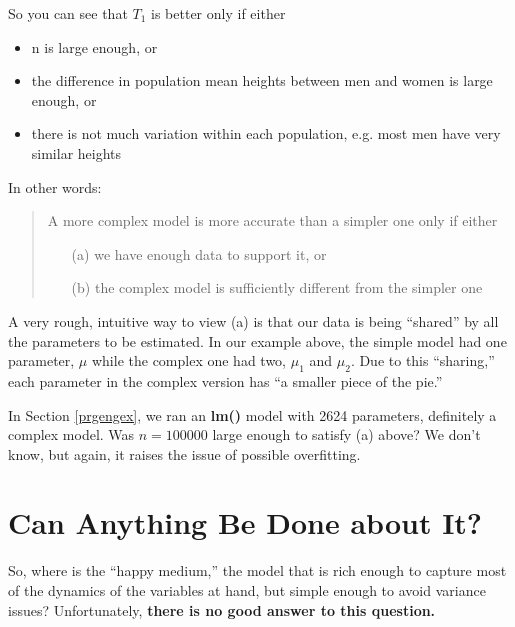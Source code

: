 So you can see that $T_1$ is better only if either

\begin{itemize}

\item n is large enough, or

\item the difference in population mean heights between men and women is
large enough, or

\item there is not much variation within each population, e.g. most men
have very similar heights

\end{itemize}

In other words:

\begin{quote}
A more complex model is more accurate than a simpler one only if either 

\begin{itemize}

\item [(a)] we have enough data to support it, or

\item [(b)] the complex model is sufficiently different from the simpler one

\end{itemize}

\end{quote}

A very rough, intuitive way to view (a) is that our data is being
``shared'' by all the parameters to be estimated.  In our example above,
the simple model had one parameter, $\mu$ while the complex one had two,
$\mu_1$ and $\mu_2$.  Due to this ``sharing,'' each parameter in the
complex version has ``a smaller piece of the pie.''

In Section \ref{prgengex}, we ran an \textbf{lm()} model with 2624
parameters, definitely a complex model.  Was $n = 100000$ large enough
to satisfy (a) above?  We don't know, but again, it raises the issue of
possible overfitting.




\section{Can Anything Be Done about It?}
\label{dosomething}

So, where is the ``happy medium,'' the model that is rich enough to
capture most of the dynamics of the variables at hand, but simple enough
to avoid variance issues?  Unfortunately, \textbf{there is no good answer to
this question.}

